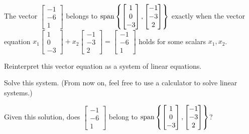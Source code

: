 \begin{applicationActivities}{2}{8}
\begin{activity}{10}
  The vector
  \(\begin{bmatrix}-1\\-6\\1\end{bmatrix}\) belongs to
  \(\operatorname{span}\left\{\begin{bmatrix}1\\0\\-3\end{bmatrix},
  \begin{bmatrix}-1\\-3\\2\end{bmatrix}\right\}\) exactly when
  the vector equation
  \(x_1\begin{bmatrix}1\\0\\-3\end{bmatrix}+
  x_2\begin{bmatrix}-1\\-3\\2\end{bmatrix}
  =\begin{bmatrix}-1\\-6\\1\end{bmatrix}\) holds for some scalars
  \(x_1,x_2\).
  \begin{subactivity}
    Reinterpret this vector equation as a system of linear equations.
  \end{subactivity}
  \begin{subactivity}
    Solve this system. (From now on, feel free to use a calculator
    to solve linear systems.)
  \end{subactivity}
  \begin{subactivity}
    Given this solution, does
    \(\begin{bmatrix}-1\\-6\\1\end{bmatrix}\) belong to
    \(\operatorname{span}\left\{\begin{bmatrix}1\\0\\-3\end{bmatrix},
    \begin{bmatrix}-1\\-3\\2\end{bmatrix}\right\}\)?
  \end{subactivity}
\end{activity}


\end{applicationActivities}
